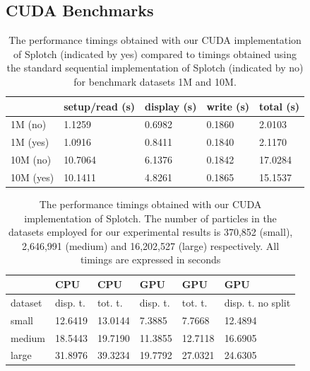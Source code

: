 \subsection{CUDA Benchmarks}

\begin{table}
\caption{The performance timings obtained with our CUDA implementation of Splotch (indicated by yes) compared to timings obtained using the standard sequential implementation of Splotch (indicated by no) for benchmark datasets 1M and 10M.}
\begin{center}
\begin{tabular}{|l|l|l|l|l|}
\hline
	& setup/read (s) & 	display (s) & 	write (s) & 	total (s) \\
\hline
1M (no) & 	1.1259 & 	0.6982 & 	0.1860 & 	2.0103 \\
\hline
1M (yes) & 	1.0916 & 	0.8411 & 	0.1840 & 	2.1170 \\
\hline
10M (no) & 	10.7064 & 	6.1376 & 	0.1842 & 	17.0284 \\
\hline
10M (yes) & 	10.1411 & 	4.8261 & 	0.1865 & 	15.1537 \\
\hline
\end{tabular}
\end{center}
\end{table}

\begin{table}
\caption{The performance timings obtained with our CUDA implementation of Splotch. 
The number of particles in the datasets employed for our experimental results is 
370,852 (small), 2,646,991 (medium) and 16,202,527 (large) respectively. All timings are 
expressed in seconds}

\begin{center}
\begin{tabular}{ | l || l | l || l | l | p{3cm} |}
\hline  
   &	CPU	& CPU	& GPU	& GPU	& GPU \\
\hline
  dataset & disp. t. & tot. t. & disp. t. & tot. t. & disp. t. no split \\
\hline  
  small &	12.6419	& 13.0144	& 7.3885	& 7.7668	& 12.4894 \\
\hline
  medium &	18.5443 &	19.7190 &	11.3855 &	12.7118 &	16.6905 \\
\hline
  large	& 31.8976 &	39.3234 &	19.7792 &	27.0321	& 24.6305\\
\hline
\end{tabular}
\end{center}
\end{table}

